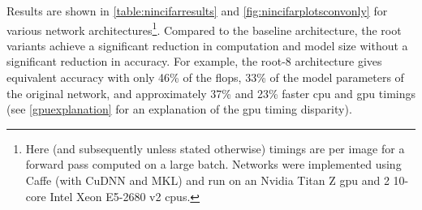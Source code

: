 \documentclass[thesis]{subfiles}
\begin{document}
	Results are shown in \cref{table:nincifarresults} and \cref{fig:nincifarplotsconvonly} for various network architectures\footnote{Here (and subsequently unless stated otherwise) timings are per image for a forward pass computed on a large batch. Networks were implemented using Caffe (with CuDNN and MKL) and run on an Nvidia Titan Z \gls{gpu} and 2 10-core Intel Xeon E5-2680 v2 \gls{cpu}s.}. Compared to the baseline architecture, the root variants achieve a significant reduction in computation and model size without a significant reduction in accuracy. For example, the root-8 architecture gives equivalent accuracy with only 46\% of the \gls{flops}, 33\% of the model parameters of the original network, and approximately 37\% and 23\% faster \gls{cpu} and \gls{gpu} timings (see \cref{gpuexplanation} for an explanation of the \gls{gpu} timing disparity).
	
	\newcommand{\covarlabels}[5]{%
		\begin{tikzpicture}[anchor=south west]
		\node [inner sep=0pt] (c)
		{
			#5
		};
		\ifx\covarwidth\undefined
		\newlength{\covarwidth}
		\newlength{\covarheight}
		\fi
		\settowidth{\covarwidth}{#5}
		\settoheight{\covarheight}{#5}
		\path[use as bounding box] (c.south west) rectangle (c.north east);
		\node [anchor=south west, xshift=-0.5em, yshift=-0.5em, rotate=45] at (c.north west) {\footnotesize 0};
		\node [anchor=south east, xshift=\covarwidth, yshift=-0.2em] at (c.north west) {\footnotesize #4};
		\node [anchor=south west, xshift=0.25em, yshift=-1.05\covarheight, rotate=90] at (c.north west) {\footnotesize #2};
		\node [anchor=south, xshift=0.5\covarwidth] at (c.north west) {\footnotesize\texttt{#3}};
		\node [anchor=south, xshift=0.2em, yshift=-0.5\covarheight, rotate=90] at (c.north west) {\footnotesize \texttt{#1}};
		\end{tikzpicture}%
	}
	
\end{document}
